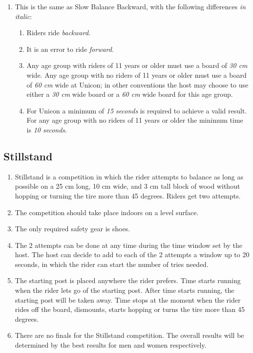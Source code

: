 \begin{enumerate}[leftmargin=1.5em,labelsep=*]
	\item This is the same as Slow Balance Backward, with the following differences \textit {in italic}:
	\begin{enumerate}[label*=\arabic*,leftmargin=1.5em,labelsep=*]
		\item Riders ride \textit{backward}.
		\item It is an error to ride \textit{forward}.
		\item Any age group with riders of 11 years or older must use a board of \textit{30 cm} wide.
		Any age group with no riders of 11 years or older must use a board of \textit{60 cm} wide at Unicon; in other conventions the host may choose to use either a \textit{30 cm} wide board or a \textit{60 cm} wide board for this age group.
		\item For Unicon a minimum of \textit{15 seconds} is required to achieve a valid result.
		For any age group with no riders of 11 years or older the minimum time is \textit{10 seconds}.
	\end{enumerate}
\end{enumerate}

\subsection{Stillstand}

\begin{enumerate}[leftmargin=1.5em,labelsep=*]
	\item Stillstand is a competition in which the rider attempts to balance as long as possible 
  on a 25 cm long, 10 cm wide, and 3 cm tall block of wood without hopping or turning the tire more than 45 degrees.
	Riders get two attempts.
	
	\item The competition should take place indoors on a level surface.
	
	\item The only required safety gear is shoes.
	
	\item The 2 attempts can be done at any time during the time window set by the host.
	The host can decide to add to each of the 2 attempts a window up to 20 seconds, 
  in which the rider can start the number of tries needed.
	
	\item The starting post is placed anywhere the rider prefers.
	Time starts running when the rider lets go of the starting post.
	After time starts running, the starting post will be taken away.
	Time stops at the moment when the rider rides off the board, dismounts, starts hopping or turns the tire more than 45 degrees.
	
	\item There are no finals for the Stillstand competition.
	The overall results will be determined by the best results for men and women respectively.
\end{enumerate}